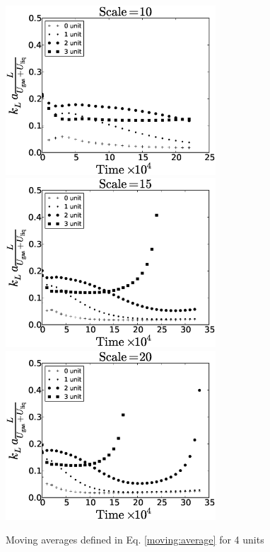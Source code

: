 \documentclass{article}
\begin{document}
\begin{figure}[htb!]
\includegraphics[width=0.7\textwidth]{Figures/aver_moving_window4scale10.eps}\\
\includegraphics[width=0.7\textwidth]{Figures/aver_moving_window4scale15.eps}\\
\includegraphics[width=0.7\textwidth]{Figures/aver_moving_window4scale20.eps}\\
\caption{Moving averages defined in Eq. \ref{moving:average} for 4 units
\label{fig:moving:average:window4}}
\end{figure}
\end{document}
